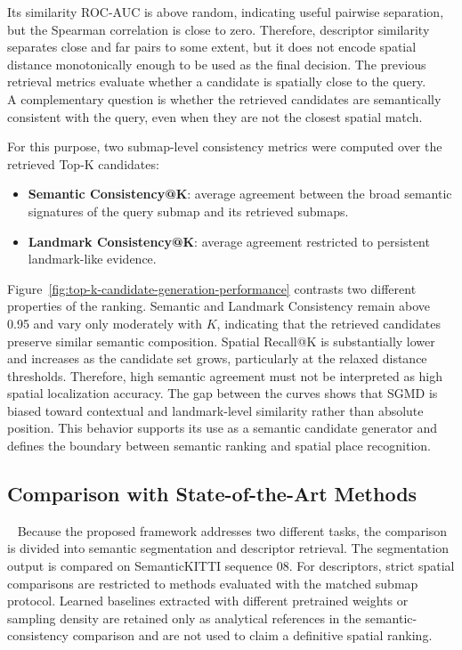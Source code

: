 Its similarity ROC-AUC is above random, indicating useful pairwise separation, but the Spearman correlation is close to zero. Therefore, descriptor similarity separates close and far pairs to some extent, but it does not encode spatial distance monotonically enough to be used as the final decision.
The previous retrieval metrics evaluate whether a candidate is spatially close to the query. \\
A complementary question is whether the retrieved candidates are semantically consistent with the query, even when they are not the closest spatial match. 

For this purpose, two submap-level consistency metrics were computed over the retrieved Top-K candidates:
\begin{itemize}
    \item \textbf{Semantic Consistency@K}: average agreement between the broad semantic signatures of the query submap and its retrieved submaps.
    \item \textbf{Landmark Consistency@K}: average agreement restricted to persistent landmark-like evidence.
\end{itemize}

Figure~\ref{fig:top-k-candidate-generation-performance} contrasts two different properties of the ranking. Semantic and Landmark Consistency remain above 0.95 and vary only moderately with $K$, indicating that the retrieved candidates preserve similar semantic composition. Spatial Recall@K is substantially lower and increases as the candidate set grows, particularly at the relaxed distance thresholds. Therefore, high semantic agreement must not be interpreted as high spatial localization accuracy.
The gap between the curves shows that SGMD is biased toward contextual and landmark-level similarity rather than absolute position. This behavior supports its use as a semantic candidate generator and defines the boundary between semantic ranking and spatial place recognition.

\subsection{Comparison with State-of-the-Art Methods}~\label{subsec:comparison-sota}
Because the proposed framework addresses two different tasks, the comparison is divided into semantic segmentation and descriptor retrieval. The segmentation output is compared on SemanticKITTI sequence 08. For descriptors, strict spatial comparisons are restricted to methods evaluated with the matched submap protocol. Learned baselines extracted with different pretrained weights or sampling density are retained only as analytical references in the semantic-consistency comparison and are not used to claim a definitive spatial ranking.

